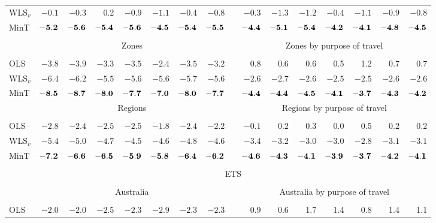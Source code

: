 \documentclass[10pt,a4paper]{article}
\begin{document}
\begin{enumerate}
\begin{table*}[!htb]
\begin{threeparttable}
\begin{tabular}{lrrrrrrrrrrrrrrr}
  WLS$_v$ & $-0.1$ & $-0.3$ & 0.2 & $-0.9$ & $-1.1$ & $-0.4$ & $-0.8$ & & $-0.3$ & $-1.3$ & $-1.2$ & $-0.4$ & $-1.1$ & $-0.9$ & $-0.8$ \\
  MinT & ${\bf -5.2}$ & ${\bf -5.6}$ & ${\bf -5.4}$ & ${\bf -5.6}$ & ${\bf -4.5}$ & ${\bf -5.4}$ & ${\bf -5.5}$ & & ${\bf -4.4}$ & ${\bf -5.1}$ & ${\bf -5.4}$ & ${\bf -4.2}$ & ${\bf -4.1}$ & ${\bf -4.8}$ & ${\bf -4.5}$ \\
  \cline{2-8}\cline{10-16} \\[-0.3cm]
  & \multicolumn{7}{c}{Zones} & & \multicolumn{7}{c}{Zones by purpose of travel} \\
  \cline{2-8}\cline{10-16} \\[-0.3cm]
  OLS & $-3.8$ & $-3.9$ & $-3.3$ & $-3.5$ & $-2.4$ & $-3.5$ & $-3.2$ & & 0.8 & 0.6 & 0.6 & 0.5 & 1.2 & 0.7 & 0.7 \\
  WLS$_v$ & $-6.4$ & $-6.2$ & $-5.5$ & $-5.6$ & $-5.6$ & $-5.7$ & $-5.6$ & & $-2.6$ & $-2.7$ & $-2.6$ & $-2.5$ & $-2.5$ & $-2.6$ & $-2.6$ \\
  MinT & $\bf{ -8.5}$ & $\bf{ -8.7}$ & $\bf{ -8.0}$ & $\bf{ -7.7}$ & $\bf{ -7.0}$ & $\bf{ -8.0}$ & $\bf{ -7.7}$ & & $\bf{ -4.4}$ & $\bf{ -4.4}$ & $\bf{ -4.5}$ & $\bf{ -4.1}$ & $\bf{ -3.7}$ & $\bf{ -4.3}$ & $\bf{ -4.2}$ \\
  & \multicolumn{7}{c}{Regions} & & \multicolumn{7}{c}{Regions by purpose of travel} \\
  \cline{2-8}\cline{10-16} \\[-0.3cm]
  OLS & $-2.8$ & $-2.4$ & $-2.5$ & $-2.5$ & $-1.8$ & $-2.4$ & $-2.2$ & & $-0.1$ & 0.2 & 0.3 & 0.0 & 0.5 & 0.2 & 0.2 \\
  WLS$_v$ & $-5.4$ & $-5.0$ & $-4.7$ & $-4.5$ & $-4.6$ & $-4.8$ & $-4.6$ & & $-3.4$ & $-3.2$ & $-3.0$ & $-3.0$ & $-2.8$ & $-3.1$ & $-3.1$ \\
  MinT & $\bf{ -7.2}$ & $\bf{ -6.6}$ & $\bf{ -6.5}$ & $\bf{ -5.9}$ & $\bf{ -5.8}$ & $\bf{ -6.4}$ & $\bf{ -6.2}$ & & $\bf{ -4.6}$ & $\bf{ -4.3}$ & $\bf{ -4.1}$ & $\bf{ -3.9}$ & $\bf{ -3.7}$ & $\bf{ -4.2}$ & $\bf{ -4.1}$ \\
  \cline{2-8}\cline{10-16} \\[-0.3cm]
  & \multicolumn{15}{c}{ETS} \\
  \cline{2-16} \\[-0.3cm]
  & \multicolumn{7}{c}{Australia} & & \multicolumn{7}{c}{Australia by purpose of travel} \\
  \cline{2-8}\cline{10-16} \\[-0.3cm]
  OLS & $-2.0$ & $-2.0$ & $-2.5$ & $-2.3$ & $-2.9$ & $-2.3$ & $-2.3$ & & 0.9 & 0.6 & 1.7 & 1.4 & 0.8 & 1.4 & 1.1 \\

\end{tabular}
\end{threeparttable}
\end{table*}
\end{enumerate}
\end{document}
